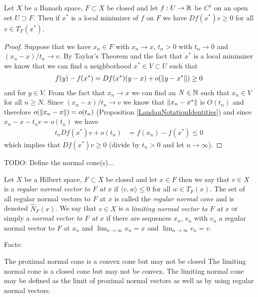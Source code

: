 \begin{thm}\label{LocalConstrainedMinimizerFirstDerivative}Let $X$ be a Banach space, $F \subset X$ be closed and let
  $f : U  \to \mathbb{R}$ be $C^1$ on an open set $U \supset F$.  Then if
  $x^*$ is a local minimizer of $f$ on $F$ we have $Df(x^*) v \geq 0$
  for all $v \in T_F(x^*)$.  
\end{thm}
\begin{proof}
Suppose that we have $x_n \in F$ with $x_n \to x$, $t_n>0$ with $t_n \to 0$
and $(x_n - x)/t_n \to v$.  By Taylor's Theorem and the fact that
$x^*$ is a local minimizer we know that we
can find a neighborhood $x^* \in V \subset U$ such that
\begin{align*}
f(y)  - f(x^*) = Df(x^*) (y - x) + o(\left \lVert y - x^* \right \rVert) \geq 0
\end{align*}
and for $y \in V$.  From the fact that $x_n \to x$ we can find an $N \in \mathbb{N}$ such
that $x_n \in V$ for all $n \geq N$.  Since $(x_n - x)/t_n \to v$ we
know that $\left \lVert x_n -x^* \right \rVert$ is $O(t_n)$ and therefore $o(\left \lVert x_n -
  x \right \rVert)=o(t_n)$ (Proposition \ref{LandauNotationIdentities}) and since $x_n - x -t_nv=o(t_n)$ we have
\begin{align*}
t_n Df(x^*) v + o(t_n) &= f(x_n) - f(x^*) \leq 0
\end{align*}
which implies that $Df(x^*) v \geq 0$ (divide by $t_n>0$ and let $n
\to \infty$).
\end{proof}

TODO: Define the normal cone(s)...
\begin{defn}Let $X$ be a Hilbert space, $F \subset X$ be closed and let
  $x \in F$ then we say that $v \in X$ is a \emph{regular normal
    vector to $F$ at $x$} if $\langle v, w \rangle \leq 0$ for all $w
  \in T_F(x)$.  The set of all regular normal vectors to $F$ at $x$ is
 called the \emph{regular normal cone} and is denoted
 $\widehat{N}_F(x)$.  We say that $v \in X$ is a \emph{limiting normal vector to $F$
    at $x$} or simply a \emph{normal vector to $F$
    at $x$} if there are sequences $x_n$, $v_n$ with $v_n$ a regular
  normal vector to $F$ at $x_n$ and $\lim_{n \to \infty} x_n = x$ and $\lim_{n \to \infty}
  v_n =v$.
\end{defn}

Facts:

The proximal normal cone is a convex cone but may not be closed
The limiting normal cone is a closed cone but may not be convex.
The limiting normal cone may be defined as the limit of proximal
normal vectors as well as by using regular normal vectors.

